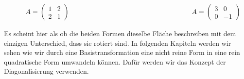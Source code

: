 \begin{figure}[h]
    \centering
    \begin{minipage}{0.4\textwidth}
        \centering
    \end{minipage}
    \hfill
    \begin{minipage}{0.4\textwidth}
        \centering
    \end{minipage}
\end{figure}

\begin{equation*}
    \begin{aligned}
        \qquad A = \begin{pmatrix} 1 & 2 \\ 2 & 1 \end{pmatrix} \qquad \qquad \qquad \qquad \qquad \qquad \qquad \qquad \qquad A = \begin{pmatrix} 3 & 0 \\ 0 & -1 \end{pmatrix}
    \end{aligned}
\end{equation*}

\vspace{0.5\baselineskip}

Es scheint hier als ob die beiden Formen dieselbe Fläche beschreiben mit dem einzigen Unterschied, dass sie rotiert sind. In folgenden Kapiteln werden wir sehen wie wir durch eine Basistransformation eine nicht reine Form in eine rein quadratische Form umwandeln können. Dafür werden wir das Konzept der Diagonalisierung verwenden. 
